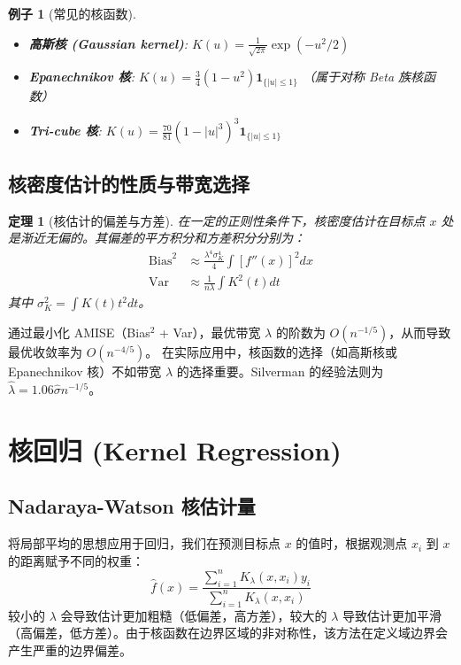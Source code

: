 \documentclass[UTF8]{ctexart}
\newtheorem{theorem}{定理}
\newtheorem{example}{例子}
\begin{document}
\begin{example}[常见的核函数]
\begin{itemize}
    \item \textbf{高斯核 (Gaussian kernel)}: $K(u) = \frac{1}{\sqrt{2\pi}} \exp(-u^2/2)$
    \item \textbf{Epanechnikov 核}: $K(u) = \frac{3}{4}(1 - u^2) \mathbf{1}_{\{|u| \le 1\}}$ （属于对称 Beta 族核函数）
    \item \textbf{Tri-cube 核}: $K(u) = \frac{70}{81}(1 - |u|^3)^3 \mathbf{1}_{\{|u| \le 1\}}$
\end{itemize}
\end{example}

\subsection{核密度估计的性质与带宽选择}
\begin{theorem}[核估计的偏差与方差]
在一定的正则性条件下，核密度估计在目标点 $x$ 处是渐近无偏的。其偏差的平方积分和方差积分分别为：
\begin{align*}
\text{Bias}^2 &\approx \frac{\lambda^4 \sigma_K^4}{4} \int [f''(x)]^2 dx \\
\text{Var} &\approx \frac{1}{n\lambda} \int K^2(t) dt
\end{align*}
其中 $\sigma_K^2 = \int K(t)t^2 dt$。
\end{theorem}
通过最小化 AMISE（Bias$^2$ + Var），最优带宽 $\lambda$ 的阶数为 $O(n^{-1/5})$，从而导致最优收敛率为 $O(n^{-4/5})$。
在实际应用中，核函数的选择（如高斯核或 Epanechnikov 核）不如带宽 $\lambda$ 的选择重要。Silverman 的经验法则为 $\hat{\lambda} = 1.06 \hat{\sigma} n^{-1/5}$。

\section{核回归 (Kernel Regression)}

\subsection{Nadaraya-Watson 核估计量}
将局部平均的思想应用于回归，我们在预测目标点 $x$ 的值时，根据观测点 $x_i$ 到 $x$ 的距离赋予不同的权重：
$$ \hat{f}(x) = \frac{\sum_{i=1}^n K_\lambda(x, x_i) y_i}{\sum_{i=1}^n K_\lambda(x, x_i)} $$
较小的 $\lambda$ 会导致估计更加粗糙（低偏差，高方差），较大的 $\lambda$ 导致估计更加平滑（高偏差，低方差）。由于核函数在边界区域的非对称性，该方法在定义域边界会产生严重的边界偏差。
\end{document}
